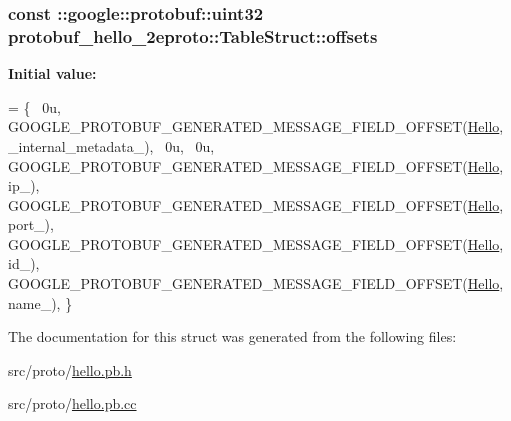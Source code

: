 \subsubsection[{\texorpdfstring{offsets}{offsets}}]{\setlength{\rightskip}{0pt plus 5cm}const \+::google\+::protobuf\+::uint32 protobuf\+\_\+hello\+\_\+2eproto\+::\+Table\+Struct\+::offsets\hspace{0.3cm}{\ttfamily [static]}}\hypertarget{structprotobuf__hello__2eproto_1_1_table_struct_a840ebe7a0940d86cc4e6a328476460ec}{}\label{structprotobuf__hello__2eproto_1_1_table_struct_a840ebe7a0940d86cc4e6a328476460ec}
{\bfseries Initial value\+:}
\begin{DoxyCode}
= \{
  ~0u,  
  GOOGLE\_PROTOBUF\_GENERATED\_MESSAGE\_FIELD\_OFFSET(\hyperlink{class_hello}{Hello}, \_internal\_metadata\_),
  ~0u,  
  ~0u,  
  GOOGLE\_PROTOBUF\_GENERATED\_MESSAGE\_FIELD\_OFFSET(\hyperlink{class_hello}{Hello}, ip\_),
  GOOGLE\_PROTOBUF\_GENERATED\_MESSAGE\_FIELD\_OFFSET(\hyperlink{class_hello}{Hello}, port\_),
  GOOGLE\_PROTOBUF\_GENERATED\_MESSAGE\_FIELD\_OFFSET(\hyperlink{class_hello}{Hello}, id\_),
  GOOGLE\_PROTOBUF\_GENERATED\_MESSAGE\_FIELD\_OFFSET(\hyperlink{class_hello}{Hello}, name\_),
\}
\end{DoxyCode}


The documentation for this struct was generated from the following files\+:\begin{DoxyCompactItemize}
\item 
src/proto/\hyperlink{hello_8pb_8h}{hello.\+pb.\+h}\item 
src/proto/\hyperlink{hello_8pb_8cc}{hello.\+pb.\+cc}\end{DoxyCompactItemize}
